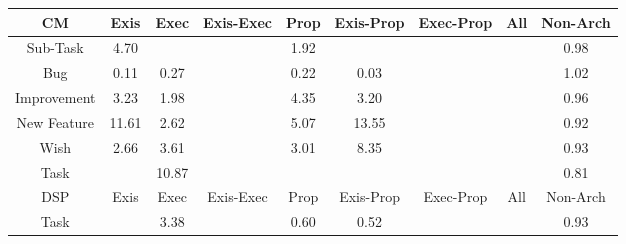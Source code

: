 \begin{tabular}{|c||c|c|c|c|c|c|c|c|}
\hline
\hline
CM & Exis & Exec & Exis-Exec & Prop & Exis-Prop & Exec-Prop & All & Non-Arch \\ 
\hline
Sub-Task & \cellcolor[rgb]{0.8342390374540772,0.8041132282677208,0.42000000000000004} 4.70 &  &  & \cellcolor[rgb]{0.8911491616938677,0.8310706555392003,0.42} 1.92 &  &  &  & \cellcolor[rgb]{0.9076066544173129,0.8286714975752809,0.417766210789492} 0.98 \\ 
\hline
Bug & \cellcolor[rgb]{0.7726880200762619,0.19005662836097303,0.2918421520711778} 0.11 & \cellcolor[rgb]{0.7976180641963682,0.3080588371961423,0.31511019324994355} 0.27 &  & \cellcolor[rgb]{0.7901758160313179,0.27283219588157137,0.30816409496256336} 0.22 & \cellcolor[rgb]{0.76,0.13,0.28} 0.03 &  &  & \cellcolor[rgb]{0.9095919296708411,0.8398067035282931,0.42} 1.02 \\ 
\hline
Improvement & \cellcolor[rgb]{0.8644089934731889,0.8184042600662473,0.42} 3.23 & \cellcolor[rgb]{0.8900075859412473,0.8305299091300645,0.42} 1.98 &  & \cellcolor[rgb]{0.8414743722620283,0.8075404921241186,0.42} 4.35 & \cellcolor[rgb]{0.8649692150354827,0.8186696281747022,0.42} 3.20 &  &  & \cellcolor[rgb]{0.9042657740942092,0.8128579973792563,0.4146480558212618} 0.96 \\ 
\hline
New Feature & \cellcolor[rgb]{0.6927095318570551,0.7370729361428154,0.42} 11.61 & \cellcolor[rgb]{0.876921091046613,0.824331043127343,0.42} 2.62 &  & \cellcolor[rgb]{0.826698200519253,0.8005412528775409,0.42} 5.07 & \cellcolor[rgb]{0.6530498052244569,0.7182867498431638,0.42} 13.55 &  &  & \cellcolor[rgb]{0.8975179365010932,0.7809182327718415,0.4083500740676871} 0.92 \\ 
\hline
Wish & \cellcolor[rgb]{0.8759198955434597,0.8238567926258493,0.42} 2.66 & \cellcolor[rgb]{0.8565885386736266,0.8146998341085601,0.42000000000000004} 3.61 &  & \cellcolor[rgb]{0.8688762969298434,0.8205203511772943,0.42} 3.01 & \cellcolor[rgb]{0.7596143432741618,0.7687646889193398,0.42000000000000004} 8.35 &  &  & \cellcolor[rgb]{0.8997083283930802,0.7912860877272464,0.4103944398335415} 0.93 \\ 
\hline
Task &  & \cellcolor[rgb]{0.7079898130714479,0.7443109640864753,0.42} 10.87 &  &  &  &  &  & \cellcolor[rgb]{0.8799575050460957,0.6977988572181864,0.39196033804302266} 0.81 \\ 
\hline
\hline
DSP & Exis & Exec & Exis-Exec & Prop & Exis-Prop & Exec-Prop & All & Non-Arch \\ 
\hline
Task &  & \cellcolor[rgb]{0.8612985321708989,0.8169308836598994,0.42} 3.38 &  & \cellcolor[rgb]{0.8486823675558766,0.5497632064311488,0.36277020971881807} 0.60 & \cellcolor[rgb]{0.8353863528815222,0.4868287369725382,0.35036059602275405} 0.52 &  &  & \cellcolor[rgb]{0.8996505789986913,0.791012740593805,0.41034054039877843} 0.93 \\ 

\end{tabular}
